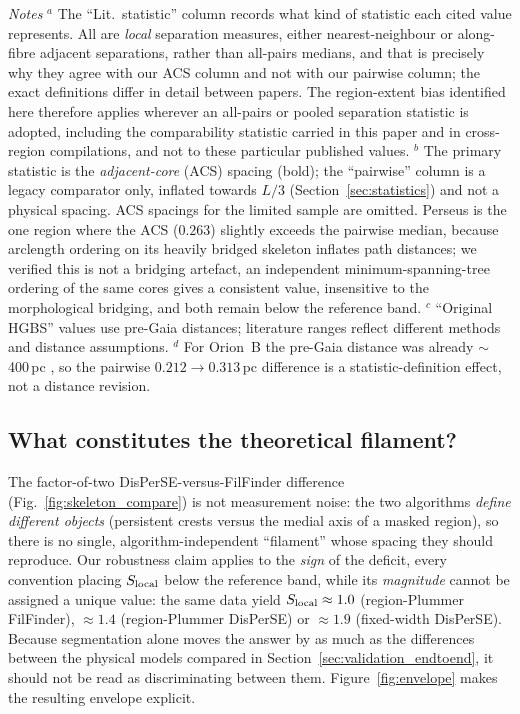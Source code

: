\documentclass[usenatbib,twoside,twocolumn]{mnras}
\begin{document}
\begin{table}
\vspace{0.1in}
\footnotesize
\emph{Notes} $^{a}$ The ``Lit.\ statistic'' column records what kind of statistic each cited value represents. All are \emph{local} separation measures, either nearest-neighbour or along-fibre adjacent separations, rather than all-pairs medians, and that is precisely why they agree with our ACS column and not with our pairwise column; the exact definitions differ in detail between papers. The region-extent bias identified here therefore applies wherever an all-pairs or pooled separation statistic is adopted, including the comparability statistic carried in this paper and in cross-region compilations, and not to these particular published values. $^{b}$ The primary statistic is the \emph{adjacent-core} (ACS) spacing (bold); the ``pairwise'' column is a legacy comparator only, inflated towards $L/3$ (Section~\ref{sec:statistics}) and not a physical spacing. ACS spacings for the limited sample are omitted. Perseus is the one region where the ACS ($0.263$) slightly exceeds the pairwise median, because arclength ordering on its heavily bridged skeleton inflates path distances; we verified this is not a bridging artefact, an independent minimum-spanning-tree ordering of the same cores gives a consistent value, insensitive to the morphological bridging, and both remain below the reference band. $^{c}$ ``Original HGBS'' values use pre-Gaia distances; literature ranges reflect different methods and distance assumptions. $^{d}$ For Orion~B the pre-Gaia distance was already $\sim$400\,pc \citep{Konyves2020}, so the pairwise $0.212\to0.313$\,pc difference is a statistic-definition effect, not a distance revision.
\end{table}

\subsection{What constitutes the theoretical filament?}
\label{sec:whatfilament}

The factor-of-two DisPerSE-versus-FilFinder difference (Fig.~\ref{fig:skeleton_compare}) is not measurement noise: the two algorithms \emph{define different objects} (persistent crests versus the medial axis of a masked region), so there is no single, algorithm-independent ``filament'' whose spacing they should reproduce. Our robustness claim applies to the \emph{sign} of the deficit, every convention placing $S_{\rm local}$ below the reference band, while its \emph{magnitude} cannot be assigned a unique value: the same data yield $S_{\rm local}\approx1.0$ (region-Plummer FilFinder), $\approx1.4$ (region-Plummer DisPerSE) or $\approx1.9$ (fixed-width DisPerSE). Because segmentation alone moves the answer by as much as the differences between the physical models compared in Section~\ref{sec:validation_endtoend}, it should not be read as discriminating between them. Figure~\ref{fig:envelope} makes the resulting envelope explicit.
\end{document}
